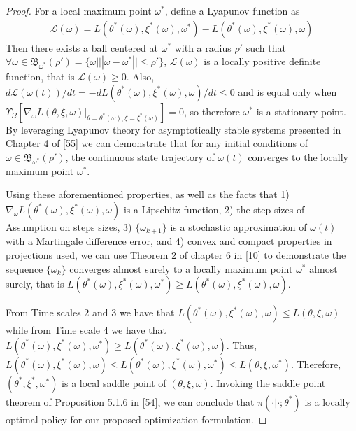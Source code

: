 \documentclass{article}
\theoremstyle{definition}
\begin{document}
\begin{proof}
For a local maximum point $\omega^*$, define a Lyapunov function as
\begin{align*}
    \mathcal{L}(\omega) = L(\theta^*(\omega),\xi^*(\omega),\omega^*) - L(\theta^*(\omega),\xi^*(\omega),\omega)
\end{align*}
Then there exists a ball centered at $\omega^*$ with a radius $\rho'$ such that $\forall \omega\in \mathfrak{B}_{\omega^*}(\rho')=\{\omega | ||\omega - \omega^*|| \leq \rho'  \}$, $\mathcal{L}(\omega)$ is a locally positive definite function, that is  $\mathcal{L}(\omega) \geq 0$. Also, $d\mathcal{L}(\omega(t))/dt = -dL(\theta^*(\omega),\xi^*(\omega),\omega)/dt\leq 0$ and is equal only when $\Upsilon_\Omega[\nabla_\omega L(\theta, \xi, \omega)|_{\theta=\theta^*(\omega),\xi=\xi^*(\omega)}] = 0$, so therefore $\omega^*$ is a stationary point. By leveraging Lyapunov theory for asymptotically stable systems presented in Chapter 4 of [55] we can demonstrate that for any initial conditions of $\omega \in \mathfrak{B}_{\omega^*}(\rho')$, the continuous state trajectory of $\omega(t)$ converges to the locally maximum point $\omega^*$.

Using these aforementioned properties, as well as the facts that 1) $\nabla_\omega L(\theta^*(\omega), \xi^*(\omega), \omega)$ is a Lipschitz function, 2) the step-sizes of Assumption on steps sizes, 3) $\{ \omega_{k+1} \}$ is a stochastic approximation of $\omega(t)$ with a Martingale difference error, and 4) convex and compact properties in projections used, we can use Theorem $2$ of chapter $6$ in [10] to demonstrate the sequence $\{\omega_k\}$ converges almost surely to a locally maximum point $\omega^*$ almost surely, that is $L(\theta^*(\omega),\xi^*(\omega),\omega^*) \geq L(\theta^*(\omega),\xi^*(\omega),\omega)$.

From Time scales $2$ and $3$ we have that $L(\theta^*(\omega),\xi^*(\omega),\omega) \leq L(\theta, \xi, \omega)$ while from Time scale $4$ we have that $L(\theta^*(\omega),\xi^*(\omega),\omega^*) \geq L(\theta^*(\omega),\xi^*(\omega),\omega)$. Thus, $L(\theta^*(\omega),\xi^*(\omega),\omega)  \leq L(\theta^*(\omega),\xi^*(\omega),\omega^*) \leq L(\theta, \xi, \omega^*)$. Therefore, $(\theta^*,\xi^*,\omega^*)$ is a local saddle point of $(\theta,\xi,\omega)$. Invoking the saddle point theorem of Proposition 5.1.6 in [54], we can conclude that $\pi(\cdot|\cdot; \theta^*)$ is a locally optimal policy for our proposed optimization formulation.
\end{proof}
\end{document}
